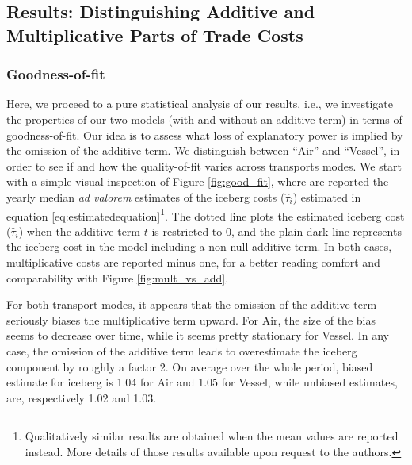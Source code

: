 \documentclass[a4paper,11pt]{article}
\begin{document}
\subsection{Results: Distinguishing Additive and Multiplicative Parts of Trade Costs}

\subsubsection{Goodness-of-fit}


Here, we proceed to a pure statistical analysis of our results, i.e., we investigate the properties of our two models (with and without an additive term) in terms of goodness-of-fit. Our idea is to assess what loss of explanatory power is implied by the omission of the additive term. We distinguish between ``Air'' and ``Vessel'', in order to see if and how the quality-of-fit varies across transports modes. We start with a simple visual inspection of Figure \ref{fig:good_fit}, where are reported the yearly median \emph{ad valorem} estimates of the iceberg costs ($\widehat{\tau}_{i}$) estimated in equation \ref{eq:estimatedequation}\footnote{Qualitatively similar results are obtained when the mean values are reported instead. More details of those results available upon request to the authors.}. The dotted line plots the estimated iceberg cost ($\widehat{\tau}_{i}$) when the additive term $t$ is restricted to 0, and the plain dark line represents the iceberg cost in the model including a non-null additive term. In both cases, multiplicative costs are reported minus one, for a better reading comfort and comparability with Figure \ref{fig:mult_vs_add}.

For both transport modes, it appears that the omission of the additive term seriously biases the multiplicative term upward. For Air, the size of the bias seems to decrease over time, while it seems pretty stationary for Vessel. In any case, the omission of the additive term leads to overestimate the iceberg component by roughly a factor 2. On average over the whole period, biased estimate for iceberg is 1.04 for Air and 1.05 for Vessel, while unbiased estimates, are, respectively 1.02 and 1.03.
\end{document}
